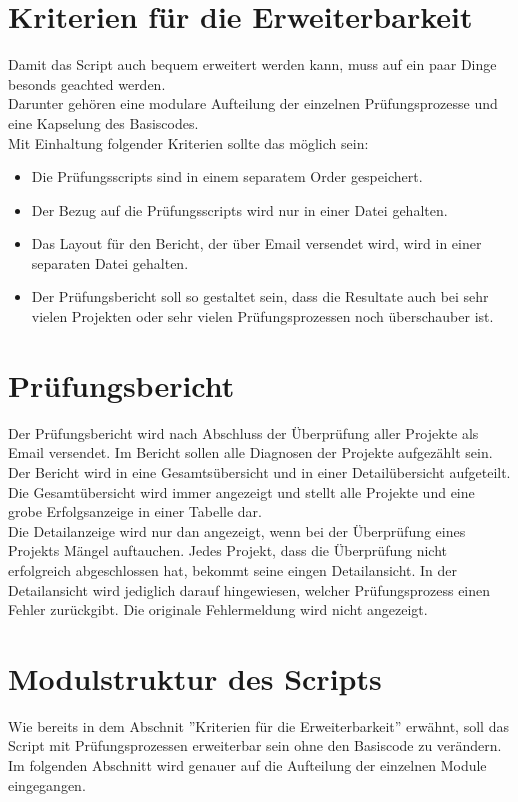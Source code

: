 \section{Kriterien für die Erweiterbarkeit}
Damit das Script auch bequem erweitert werden kann, muss auf ein paar Dinge besonds geachted werden. \\
Darunter gehören eine modulare Aufteilung der einzelnen Prüfungsprozesse und eine Kapselung des Basiscodes. \\
Mit Einhaltung folgender Kriterien sollte das möglich sein:
\begin{itemize}
    \item Die Prüfungsscripts sind in einem separatem Order gespeichert.
    \item Der Bezug auf die Prüfungsscripts wird nur in einer Datei gehalten. 
    \item Das Layout für den Bericht, der über Email versendet wird, wird in einer separaten Datei gehalten.
    \item Der Prüfungsbericht soll so gestaltet sein, dass die Resultate auch bei sehr vielen Projekten oder sehr vielen Prüfungsprozessen noch überschauber ist.
\end{itemize}

\clearpage
\section{Prüfungsbericht}
Der Prüfungsbericht wird nach Abschluss der Überprüfung aller Projekte als Email versendet. Im Bericht sollen alle Diagnosen der Projekte aufgezählt sein.
Der Bericht wird in eine Gesamtsübersicht und in einer Detailübersicht aufgeteilt. Die Gesamtübersicht wird immer angezeigt und stellt alle Projekte und eine grobe Erfolgsanzeige in einer Tabelle dar. \\
Die Detailanzeige wird nur dan angezeigt, wenn bei der Überprüfung eines Projekts Mängel auftauchen. Jedes Projekt, dass die Überprüfung nicht erfolgreich abgeschlossen hat, bekommt seine eingen Detailansicht.
In der Detailansicht wird jediglich darauf hingewiesen, welcher Prüfungsprozess einen Fehler zurückgibt. Die originale Fehlermeldung wird nicht angezeigt. 

\section{Modulstruktur des Scripts}
Wie bereits in dem Abschnit ''Kriterien für die Erweiterbarkeit'' erwähnt, soll das Script mit Prüfungsprozessen erweiterbar sein ohne den Basiscode zu verändern. Im folgenden Abschnitt wird genauer auf die Aufteilung der einzelnen Module eingegangen. \\

